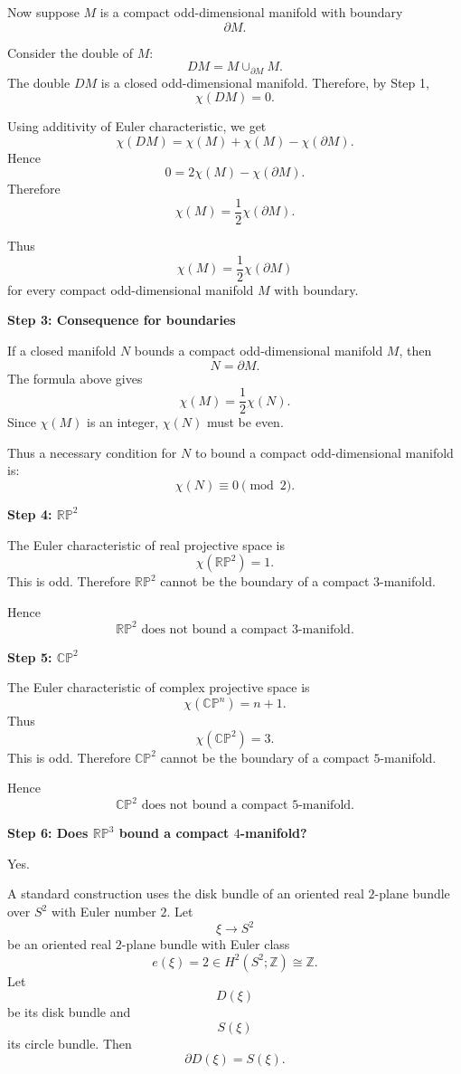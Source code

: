 \begin{solution}
Now suppose \(M\) is a compact odd-dimensional manifold with boundary
\[
\partial M.
\]

Consider the double of \(M\):
\[
DM=M\cup_{\partial M} M.
\]
The double \(DM\) is a closed odd-dimensional manifold. Therefore, by Step 1,
\[
\chi(DM)=0.
\]

Using additivity of Euler characteristic, we get
\[
\chi(DM)
=
\chi(M)+\chi(M)-\chi(\partial M).
\]
Hence
\[
0=2\chi(M)-\chi(\partial M).
\]
Therefore
\[
\chi(M)=\frac{1}{2}\chi(\partial M).
\]

Thus
\[
\boxed{
	\chi(M)=\frac{1}{2}\chi(\partial M)
}
\]
for every compact odd-dimensional manifold \(M\) with boundary.


\medskip
\noindent\textbf{Step 3: Consequence for boundaries}\par
\smallskip


If a closed manifold \(N\) bounds a compact odd-dimensional manifold \(M\), then
\[
N=\partial M.
\]
The formula above gives
\[
\chi(M)=\frac{1}{2}\chi(N).
\]
Since \(\chi(M)\) is an integer, \(\chi(N)\) must be even.

Thus a necessary condition for \(N\) to bound a compact odd-dimensional manifold
is:
\[
\chi(N)\equiv 0\pmod 2.
\]


\medskip
\noindent\textbf{Step 4: \(\mathbb{RP}^2\)}\par
\smallskip


The Euler characteristic of real projective space is
\[
\chi(\mathbb{RP}^{2})=1.
\]
This is odd. Therefore \(\mathbb{RP}^2\) cannot be the boundary of a compact
\(3\)-manifold.

Hence
\[
\boxed{
	\mathbb{RP}^2
	\text{ does not bound a compact }3\text{-manifold.}
}
\]


\medskip
\noindent\textbf{Step 5: \(\mathbb{CP}^2\)}\par
\smallskip


The Euler characteristic of complex projective space is
\[
\chi(\mathbb{CP}^n)=n+1.
\]
Thus
\[
\chi(\mathbb{CP}^2)=3.
\]
This is odd. Therefore \(\mathbb{CP}^2\) cannot be the boundary of a compact
\(5\)-manifold.

Hence
\[
\boxed{
	\mathbb{CP}^2
	\text{ does not bound a compact }5\text{-manifold.}
}
\]


\medskip
\noindent\textbf{Step 6: Does \(\mathbb{RP}^3\) bound a compact \(4\)-manifold?}\par
\smallskip


Yes.

A standard construction uses the disk bundle of an oriented real \(2\)-plane
bundle over \(S^2\) with Euler number \(2\). Let
\[
\xi\to S^2
\]
be an oriented real \(2\)-plane bundle with Euler class
\[
e(\xi)=2\in H^2(S^2;\mathbb Z)\cong \mathbb Z.
\]
Let
\[
D(\xi)
\]
be its disk bundle and
\[
S(\xi)
\]
its circle bundle. Then
\[
\partial D(\xi)=S(\xi).
\]


\end{solution}
